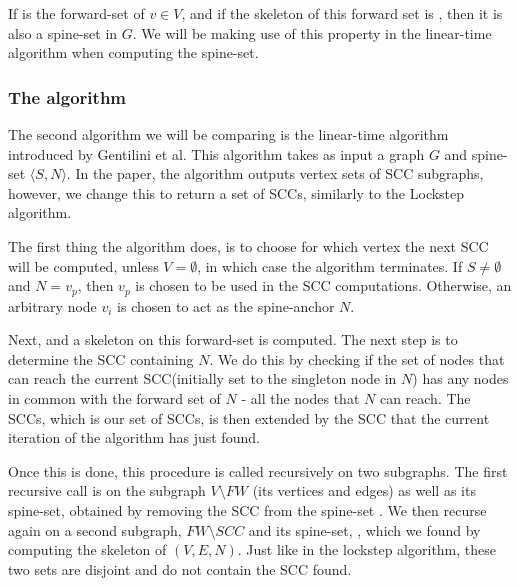\documentclass[../master/master.tex]{subfiles}
\begin{document}
If  is the forward-set of $v \in V$, and if the skeleton of this forward set is , then it is also a spine-set in $G$. We will be making use of this property in the linear-time algorithm when computing the spine-set.

\subsubsection{The algorithm}
The second algorithm we will be comparing is the linear-time algorithm \cite{linear} introduced by Gentilini et al. This algorithm takes as input a graph $G$ and spine-set $\langle S, N\rangle$. In the paper, the algorithm outputs vertex sets of SCC subgraphs, however, we change this to return a set of SCCs, similarly to the Lockstep algorithm.

The first thing the algorithm does, is to choose for which vertex the next SCC will be computed, unless $V=\emptyset$, in which case the algorithm terminates. If $S\neq\emptyset$ and $N={v_p}$, then $v_p$ is chosen to be used in the SCC computations. Otherwise, an arbitrary node $v_i$ is chosen to act as the spine-anchor $N$.

Next,  and a skeleton  on this forward-set is computed. The next step is to determine the SCC containing $N$. We do this by checking if the set of nodes that can reach the current SCC(initially set to the singleton node in $N$) has any nodes in common with the forward set of $N$ - all the nodes that $N$ can reach. The SCCs, which is our set of SCCs, is then extended by the SCC that the current iteration of the algorithm has just found.

Once this is done, this procedure is called recursively on two subgraphs. The first recursive call is on the subgraph $V\setminus FW$ (its vertices and edges) as well as its spine-set, obtained by removing the SCC from the spine-set . We then recurse again on a second subgraph, $FW\setminus SCC$ and its spine-set, , which we found by computing the skeleton of $(V, E, N)$. Just like in the lockstep algorithm, these two sets are disjoint and do not contain the SCC found.
\end{document}
